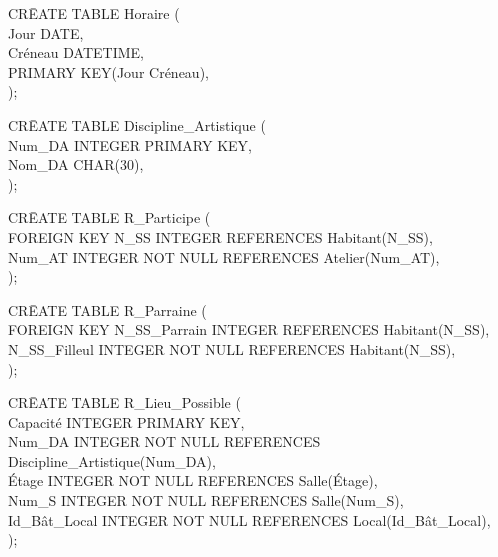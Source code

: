 \documentclass[a4paper,10.5pt]{report}
\begin{document}
		\begin{tabbing}
			CR\=EATE TABLE Horaire (\\
			\> Jour DATE,\\
			\> Créneau DATETIME,\\
			\> PRIMARY KEY(Jour Créneau),\\);
		\end{tabbing}
		\begin{tabbing}
			CR\=EATE TABLE Discipline\_Artistique (\\
			\> Num\_DA INTEGER PRIMARY KEY,\\
			\> Nom\_DA CHAR(30),\\);
		\end{tabbing}
		\begin{tabbing}
			CR\=EATE TABLE R\_Participe (\\
			\> FOREIGN KEY N\_SS INTEGER REFERENCES Habitant(N\_SS),\\
			\> Num\_AT INTEGER NOT NULL REFERENCES Atelier(Num\_AT),\\);
		\end{tabbing}
		\begin{tabbing}
			CR\=EATE TABLE R\_Parraine (\\
			\> FOREIGN KEY N\_SS\_Parrain INTEGER REFERENCES Habitant(N\_SS),\\
			\> N\_SS\_Filleul INTEGER NOT NULL REFERENCES Habitant(N\_SS),\\);
		\end{tabbing}
		\begin{tabbing}
			CR\=EATE TABLE R\_Lieu\_Possible (\\
			\> Capacité INTEGER PRIMARY KEY,\\
			\> Num\_DA INTEGER NOT NULL REFERENCES Discipline\_Artistique(Num\_DA),\\
			\> Étage INTEGER NOT NULL REFERENCES Salle(Étage),\\
			\> Num\_S INTEGER NOT NULL REFERENCES Salle(Num\_S),\\
			\> Id\_Bât\_Local INTEGER NOT NULL REFERENCES Local(Id\_Bât\_Local),\\);
		\end{tabbing}
\end{document}
